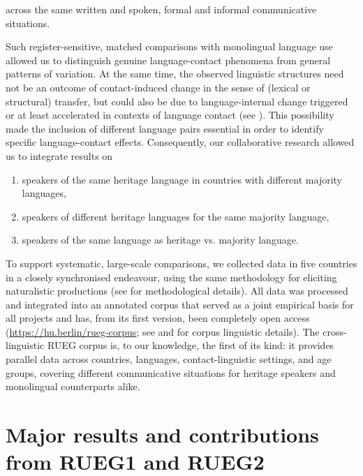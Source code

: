 \documentclass[output=paper,colorlinks,citecolor=brown]{langscibook}
\begin{document}
across the same written and spoken, formal and informal communicative situations.

Such register-sensitive, matched comparisons with monolingual language use allowed us to distinguish genuine language\hyp contact phenomena from general patterns of variation. At the same time, the observed linguistic structures need not be an outcome of contact-induced change in the sense of (lexical or structural) transfer, but could also be due to language-internal change triggered or at least accelerated in contexts of language contact (see \citealt{Silva-Corvalan1994, Wiese2013, KupischPolinsky2022}).\textsuperscript{} This possibility made the inclusion of different language pairs essential in order to identify specific language\hyp contact effects. Consequently, our collaborative research allowed us to integrate results on

\begin{enumerate}[label=(\alph*)]
\item speakers of the same heritage language in countries with different majority languages,
\item speakers of different heritage languages for the same majority language,
\item speakers of the same language as heritage vs. majority language.
\end{enumerate}

To support systematic, large-scale comparisons, we collected data in five countries in a closely synchronised endeavour, using the same methodology for eliciting naturalistic productions (see \cite{chapters/02} for methodological details). All data was processed and integrated into an annotated corpus that served as a joint empirical basis for all projects and has, from its first version, been completely open access (\url{https://hu.berlin/rueg-corpus}; see \cite{chapters/03} and \cite{Klotzetal2024} for corpus linguistic details). The cross-linguistic RUEG corpus is, to our knowledge, the first of its kind: it provides parallel data across countries, languages, contact-linguistic settings, and age groups, covering different communicative situations for heritage speakers and monolingual counterparts alike.


\section{Major results and contributions from RUEG1 and RUEG2} \label{sec:introwieseetal:results}
\end{document}
